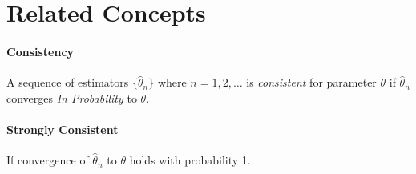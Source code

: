 \documentclass[a4paper,12pt]{scrartcl}
\begin{document}
\section{Related Concepts}

\paragraph{Consistency} A sequence of estimators $\{ \hat{\theta}_n \}$
where $n=1,2,\ldots$ is \emph{consistent} for parameter $\theta$ if
$\hat{\theta}_n$ converges \emph{In Probability} to $\theta$.

\paragraph{Strongly Consistent} If convergence of $\hat{\theta}_n$
to $\theta$ holds with probability 1.
\end{document}
